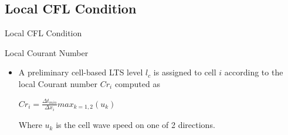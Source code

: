 \documentclass{beamer}
\begin{document}
\subsection{Local CFL Condition}
\begin{frame}[t]{Local CFL Condition}
\begin{block}{Local Courant Number}
    \begin{itemize}
      \item A preliminary cell-based LTS level $l_{c}$ is assigned to cell $i$ according to the local Courant number $Cr_{i}$ computed as
      \begin{center}
      $Cr_{i} = \frac{\Delta t_{min}}{\Delta x_{i}}max_{k=1,2}(u_{k})$
      \end{center}
      Where $u_{k}$ is the cell wave speed on one of 2 directions.
    \end{itemize}
\end{block}
\end{frame}
\end{document}
